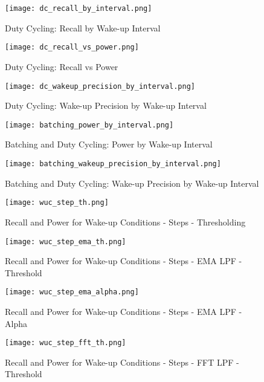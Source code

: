\begin{figure}[p]
	\texttt{[image: dc\_recall\_by\_interval.png]}
	\caption{Duty Cycling: Recall by Wake-up Interval}
    	\label{fig:dcRecallByInterval}
\end{figure}


\begin{figure}[p]
	\texttt{[image: dc\_recall\_vs\_power.png]}
	\caption{Duty Cycling: Recall vs Power}
    	\label{fig:dcRecallVsPower}
\end{figure}


\begin{figure}[p]
	\texttt{[image: dc\_wakeup\_precision\_by\_interval.png]}
	\caption{Duty Cycling: Wake-up Precision by Wake-up Interval}
    	\label{fig:dcWakeUpPrecisionByInterval}
\end{figure}


\begin{figure}[p]
	\texttt{[image: batching\_power\_by\_interval.png]}
	\caption{Batching and Duty Cycling: Power by Wake-up Interval}
    	\label{fig:batchingPowerByInterval}
\end{figure}


\begin{figure}[p]
	\texttt{[image: batching\_wakeup\_precision\_by\_interval.png]}
	\caption{Batching and Duty Cycling: Wake-up Precision by Wake-up Interval}
    	\label{fig:batchingWakeUpPrevisionByInterval}
\end{figure}


\begin{figure}[p]
	\texttt{[image: wuc\_step\_th.png]}
	\caption{Recall and Power for Wake-up Conditions - Steps - Thresholding}
    	\label{fig:wucStepTh}
\end{figure}


\begin{figure}[p]
	\texttt{[image: wuc\_step\_ema\_th.png]}
	\caption{Recall and Power for Wake-up Conditions - Steps - EMA LPF - Threshold}
    	\label{fig:wucStepEmaTh}
\end{figure}


\begin{figure}[p]
	\texttt{[image: wuc\_step\_ema\_alpha.png]}
	\caption{Recall and Power for Wake-up Conditions - Steps - EMA LPF - Alpha}
    	\label{fig:wucStepEmaAlpha}
\end{figure}


\begin{figure}[p]
	\texttt{[image: wuc\_step\_fft\_th.png]}
	\caption{Recall and Power for Wake-up Conditions - Steps - FFT LPF - Threshold}
    	\label{fig:wucStepFftTh}
\end{figure}


